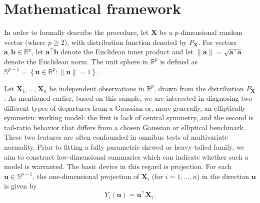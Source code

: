 \documentclass[11pt]{article}
\theoremstyle{plain}
\theoremstyle{definition}
\theoremstyle{remark}
\def\R{\mathbb{R}}
\def\X{\bm{X}}
\def\u{\bm{u}}
\newcommand{\norm}[1]{\left\| #1 \right\|}
\begin{document}


\section{Mathematical framework}
\label{sec:framework}

In order to formally describe the procedure, let $\X$ be a $p$-dimensional random vector (where $p \geqslant 2$), with distribution function denoted by $P_{\X}$. For vectors $\bm a, \bm b \in \R^{p}$, let $\bm a^{\top} \bm b$ denote the Euclidean inner product and let $\norm{\bm a}=\sqrt{\bm a^{\top} \bm a}$ denote the Euclidean norm. The unit sphere in $\R^{p}$ is defined as \(\mathbb{S}^{p-1} = \left\{\bm u \in \R^{p} : \norm{\bm u} = 1 \right\}.\)

Let $\X_1,\ldots,\X_n$ be independent observations in $\R^p$, drawn from the distribution $P_{\X}$. As mentioned earlier, based on this sample, we are interested in diagnosing two different types of departures from a Gaussian or, more generally, an elliptically symmetric working model: the first is lack of central symmetry, and the second is tail-ratio behavior that differs from a chosen Gaussian or elliptical benchmark. These two features are often confounded in omnibus tests of multivariate normality. Prior to fitting a fully parametric skewed or heavy-tailed family, we aim to construct low-dimensional summaries which can indicate whether such a model is warranted. The basic device in this regard is projection. For each $\u \in \mathbb{S}^{p-1}$, the one-dimensional projection of $\X_i$ (for $i=1,\ldots,n$) in the direction $\u$ is given by
\begin{equation*}
    Y_i(\u) = \u^\top \X_i.
\end{equation*}
\end{document}
